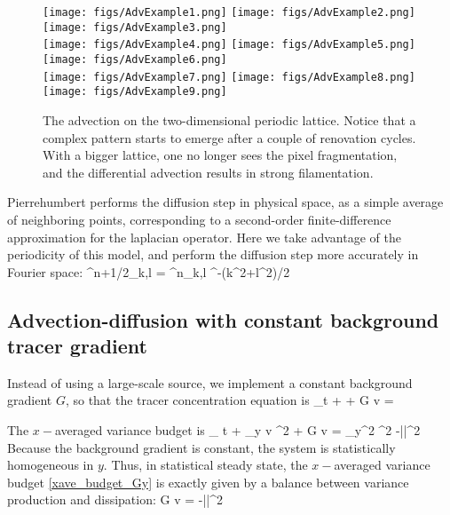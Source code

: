 \documentclass[11pt]{article}
\begin{document}
\begin{figure}[ht]
    \centering
       \texttt{[image: figs/AdvExample1.png]}
       \texttt{[image: figs/AdvExample2.png]}
       \texttt{[image: figs/AdvExample3.png]}\\
       \texttt{[image: figs/AdvExample4.png]}
       \texttt{[image: figs/AdvExample5.png]}
       \texttt{[image: figs/AdvExample6.png]}\\
       \texttt{[image: figs/AdvExample7.png]}
       \texttt{[image: figs/AdvExample8.png]}
       \texttt{[image: figs/AdvExample9.png]}
       \caption{\small The advection on the two-dimensional periodic lattice. Notice that a complex pattern starts to emerge
    		after a couple of renovation cycles. With a bigger lattice, one no longer sees the pixel fragmentation,
		and the differential advection results in strong filamentation.}
		    \label{latticei}
\end{figure}

Pierrehumbert performs the diffusion step in physical space, as a simple average of neighboring points, corresponding
to a second-order finite-difference approximation for the laplacian operator. Here we take advantage of the periodicity
of this model, and perform the diffusion step more accurately in Fourier space:
\beq
\label{diff}
\hat{\vth}^{n+1/2}_{k,l} = \hat{\vth}^{n}_{k,l} \ee^{-\kappa(k^2+l^2)\tau/2}\per
\eeq

\subsection{Advection-diffusion with constant background tracer gradient}
Instead of using a large-scale source, we implement a constant background gradient $G$,
so that the tracer concentration equation is
\beq
\vth_t  + \cdot\nabla \vth + G v =  \kappa \lap \vth\per
\eeq

The $x-$averaged variance budget is
\beq
\label{xave_budget_Gy}
\p_ t \la \half \vth \raxt +  \p_y \la \half v \vth^2 \raxt + G \la v \vth \raxt  = \p_y^2 \la \half \vth^2 \raxt -\kappa \la  |\nabla \vth|^2\raxt \per
\eeq
Because the background gradient is constant, the system is statistically homogeneous in $y$. Thus, in statistical steady state,
the $x-$averaged variance budget \eqref{xave_budget_Gy} is exactly given by a balance between variance production and dissipation:
\beq
G \la v \vth \raxt  = -\kappa \la  |\nabla \vth|^2\raxt \per
\eeq
\end{document}
